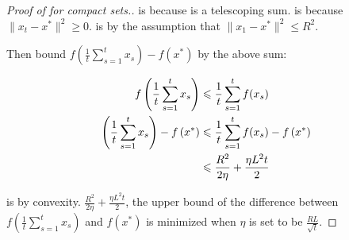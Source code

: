 \begin{proof}[Proof of  for compact sets.]
 is because  is a telescoping sum.
 is because $\lVert x_{t} - x^* \rVert^2 \geq 0$.
 is by the assumption that $\lVert x_1 - x^* \rVert^2 \leq R^2$.

Then bound $f\left(\frac{1}{t}\sum_{s=1}^t x_s\right) - f\left(x^*\right)$ by
the above sum:

\begin{align}
    f\left(\frac{1}{t}\sum_{s=1}^t x_s\right) &\leq \frac{1}{t} \sum_{s=1}^t f(x_s) \equationlabel{k} \\
    \left(\frac{1}{t}\sum_{s=1}^t x_s\right) - f\left(x^*\right) &\leq \frac{1}{t} \sum_{s=1}^t f(x_s) - f\left(x^*\right) \equationlabel{l} \\
    &\leq \frac{R^2}{2\eta} + \frac{\eta L^2 t}{2}
\end{align}

 is by convexity. $\frac{R^2}{2\eta} + \frac{\eta L^2 t}{2}$,
the upper bound of the difference between $f\left(\frac{1}{t}\sum_{s=1}^t
x_s\right)$ and $f\left(x^*\right)$ is minimized when $\eta$ is set to be
$\frac{RL}{\sqrt{t}}$. 

\end{proof}
